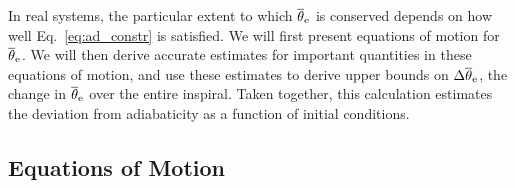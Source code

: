 \documentclass[
        fleqn,
        usenatbib,
    ]{mnras}
\begin{document}
In real systems, the particular extent to which $\overline{\theta}_{\rm e}$ is
conserved depends on how well Eq.~\eqref{eq:ad_constr} is satisfied. We will
first present equations of motion for $\overline{\theta}_{\rm e}$. We will then
derive accurate estimates for important quantities in these equations of motion,
and use these estimates to derive upper bounds on $\Delta \overline{\theta}_{\rm
e}$, the change in $\overline{\theta}_{\rm e}$ over the entire inspiral. Taken
together, this calculation estimates the deviation from adiabaticity as a
function of initial conditions.

\subsection{Equations of Motion}\label{ss:eom_0}
\end{document}

